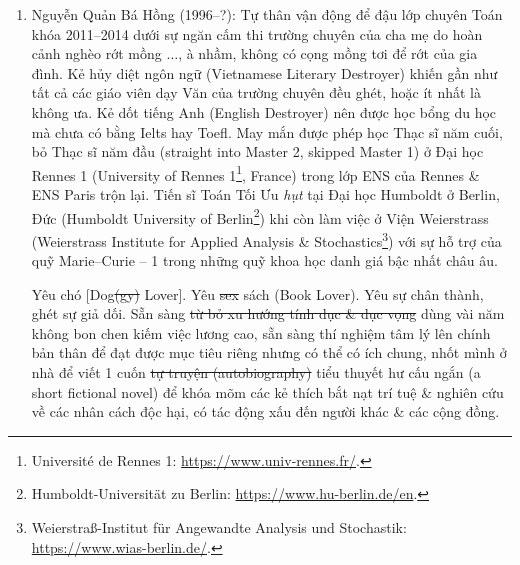 \documentclass[12pt]{article}
\begin{document}
\begin{enumerate}
	\item {\sc Nguyễn Quản Bá Hồng} (1996--?): Tự thân vận động để đậu lớp chuyên Toán khóa 2011--2014 dưới sự ngăn cấm thi trường chuyên của cha mẹ do hoàn cảnh nghèo rớt mồng $\ldots$, à nhầm, không có cọng mồng tơi để rớt của gia đình. Kẻ hủy diệt ngôn ngữ (Vietnamese Literary Destroyer) khiến gần như tất cả các giáo viên dạy Văn của trường chuyên đều ghét, hoặc ít nhất là không ưa. Kẻ dốt tiếng Anh (English Destroyer) nên được học bổng du học mà chưa có bằng {\sc Ielts} hay {\sc Toefl}. May mắn được phép học Thạc sĩ năm cuối, bỏ Thạc sĩ năm đầu (straight into Master 2, skipped Master 1) ở Đại học Rennes 1 (University of Rennes 1\footnote{Universit\'e de Rennes 1: \url{https://www.univ-rennes.fr/}.}, France) trong lớp ENS của Rennes \& ENS Paris trộn lại. Tiến sĩ Toán Tối Ưu {\it hụt} tại Đại học Humboldt ở Berlin, Đức (Humboldt University of Berlin\footnote{Humboldt-Universität zu Berlin: \url{https://www.hu-berlin.de/en}.}) khi còn làm việc ở Viện Weierstrass (Weierstrass Institute for Applied Analysis \& Stochastics\footnote{Weierstraß-Institut für Angewandte Analysis und Stochastik: \url{https://www.wias-berlin.de/}.}) với sự hỗ trợ của quỹ Marie--Curie -- 1 trong những quỹ khoa học danh giá bậc nhất châu {\sc âu}.
	
	Yêu chó [Dog\st{(gy)} Lover]. Yêu \st{sex} sách (Book Lover). Yêu sự chân thành, ghét sự giả dối. Sẵn sàng \st{từ bỏ xu hướng tính dục \& dục vọng} dùng vài năm không bon chen kiếm việc lương cao, sẵn sàng thí nghiệm tâm lý lên chính bản thân để đạt được mục tiêu riêng nhưng có thể có ích chung, nhốt mình ở nhà để viết 1 cuốn \st{tự truyện (autobiography)} tiểu thuyết hư cấu ngắn (a short fictional novel) để khóa mõm các kẻ thích bắt nạt trí tuệ \& nghiên cứu về các nhân cách độc hại, có tác động xấu đến người khác \& các cộng đồng.
	

\end{enumerate}
\end{document}
